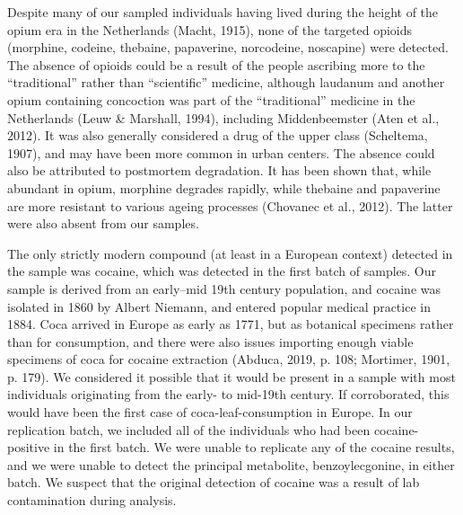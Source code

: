 \documentclass[
]{article}
\begin{document}
Despite many of our sampled individuals having lived during the height
of the opium era in the Netherlands (Macht, 1915), none of the targeted
opioids (morphine, codeine, thebaine, papaverine, norcodeine, noscapine)
were detected. The absence of opioids could be a result of the people
ascribing more to the ``traditional'' rather than ``scientific''
medicine, although laudanum and another opium containing concoction was
part of the ``traditional'' medicine in the Netherlands (Leuw \&
Marshall, 1994), including Middenbeemster (Aten et al., 2012). It was
also generally considered a drug of the upper class (Scheltema, 1907),
and may have been more common in urban centers. The absence could also
be attributed to postmortem degradation. It has been shown that, while
abundant in opium, morphine degrades rapidly, while thebaine and
papaverine are more resistant to various ageing processes (Chovanec et
al., 2012). The latter were also absent from our samples.

The only strictly modern compound (at least in a European context)
detected in the sample was cocaine, which was detected in the first
batch of samples. Our sample is derived from an early--mid 19th century
population, and cocaine was isolated in 1860 by Albert Niemann, and
entered popular medical practice in 1884. Coca arrived in Europe as
early as 1771, but as botanical specimens rather than for consumption,
and there were also issues importing enough viable specimens of coca for
cocaine extraction (Abduca, 2019, p. 108; Mortimer, 1901, p. 179). We
considered it possible that it would be present in a sample with most
individuals originating from the early- to mid-19th century. If
corroborated, this would have been the first case of
coca-leaf-consumption in Europe. In our replication batch, we included
all of the individuals who had been cocaine-positive in the first batch.
We were unable to replicate any of the cocaine results, and we were
unable to detect the principal metabolite, benzoylecgonine, in either
batch. We suspect that the original detection of cocaine was a result of
lab contamination during analysis.
\end{document}
